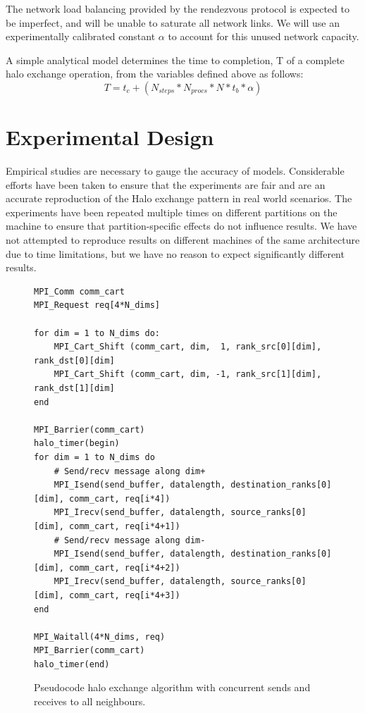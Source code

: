 \documentclass{acm_proc_article-sp}
\begin{document}
The network load balancing provided by the rendezvous protocol is expected to
be imperfect, and will be unable to saturate all network links.  We will use an experimentally calibrated constant \textbf{$\alpha$}
to account for this unused network capacity.

A simple analytical model determines the time to completion, T of a complete halo exchange operation,
from the variables defined above as follows:
\begin{equation}
  T = t_c + (N_{steps} * N_{procs} * N * t_b * \alpha)
\end{equation}


\section{Experimental Design}\label{sect:experimental design}

Empirical studies are necessary to gauge the accuracy of models. Considerable efforts have
been taken to ensure that the experiments are fair and are an accurate reproduction of the Halo exchange pattern
in real world scenarios. The experiments have been repeated multiple times on different partitions on the machine
to ensure that partition-specific effects do not influence results.
We have not attempted to reproduce results on different machines
of the same architecture due to time limitations, but we have no
reason to expect significantly different results.

\begin{figure}[ht]
  {\footnotesize
  \begin{lstlisting}[frame=lines, basicstyle=\ttfamily,columns=fixed]
MPI_Comm comm_cart
MPI_Request req[4*N_dims]

for dim = 1 to N_dims do:
    MPI_Cart_Shift (comm_cart, dim,  1, rank_src[0][dim], rank_dst[0][dim]
    MPI_Cart_Shift (comm_cart, dim, -1, rank_src[1][dim], rank_dst[1][dim]
end

MPI_Barrier(comm_cart)
halo_timer(begin)
for dim = 1 to N_dims do
    # Send/recv message along dim+
    MPI_Isend(send_buffer, datalength, destination_ranks[0][dim], comm_cart, req[i*4])
    MPI_Irecv(send_buffer, datalength, source_ranks[0][dim], comm_cart, req[i*4+1])
    # Send/recv message along dim-
    MPI_Isend(send_buffer, datalength, destination_ranks[0][dim], comm_cart, req[i*4+2])
    MPI_Irecv(send_buffer, datalength, source_ranks[0][dim], comm_cart, req[i*4+3])
end

MPI_Waitall(4*N_dims, req)
MPI_Barrier(comm_cart)
halo_timer(end)
  \end{lstlisting}
  }
  \caption{Pseudocode halo exchange algorithm with concurrent sends and
           receives to all neighbours.}
    \label{fig:halo_pseudocode}
\end{figure}
\end{document}
